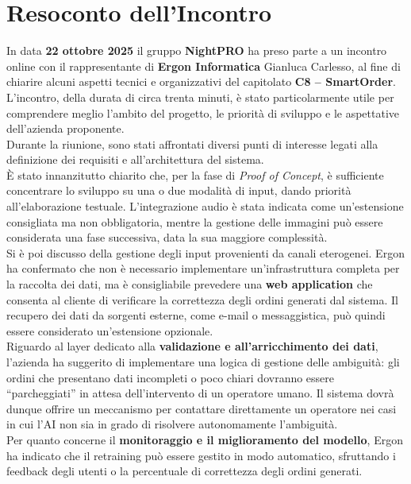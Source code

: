 \documentclass[a4paper, 11pt, oneside]{scrartcl} %
\begin{document}
\section{Resoconto dell'Incontro}

In data \textbf{22 ottobre 2025} il gruppo \textbf{NightPRO} ha preso parte a un incontro online con il rappresentante di \textbf{Ergon Informatica} Gianluca Carlesso, al fine di chiarire alcuni aspetti tecnici e organizzativi del capitolato \textbf{C8 – SmartOrder}.  
L’incontro, della durata di circa trenta minuti, è stato particolarmente utile per comprendere meglio l’ambito del progetto, le priorità di sviluppo e le aspettative dell’azienda proponente.
\noindent \\
Durante la riunione, sono stati affrontati diversi punti di interesse legati alla definizione dei requisiti e all’architettura del sistema.
\noindent \\
È stato innanzitutto chiarito che, per la fase di \textit{Proof of Concept}, è sufficiente concentrare lo sviluppo su una o due modalità di input, dando priorità all’elaborazione testuale.  
L’integrazione audio è stata indicata come un’estensione consigliata ma non obbligatoria, mentre la gestione delle immagini può essere considerata una fase successiva, data la sua maggiore complessità.
\noindent \\
Si è poi discusso della gestione degli input provenienti da canali eterogenei.  
Ergon ha confermato che non è necessario implementare un’infrastruttura completa per la raccolta dei dati, ma è consigliabile prevedere una \textbf{web application} che consenta al cliente di verificare la correttezza degli ordini generati dal sistema.  
Il recupero dei dati da sorgenti esterne, come e-mail o messaggistica, può quindi essere considerato un’estensione opzionale.
\noindent \\
Riguardo al layer dedicato alla \textbf{validazione e all’arricchimento dei dati}, l’azienda ha suggerito di implementare una logica di gestione delle ambiguità: gli ordini che presentano dati incompleti o poco chiari dovranno essere “parcheggiati” in attesa dell’intervento di un operatore umano.  
Il sistema dovrà dunque offrire un meccanismo per contattare direttamente un operatore nei casi in cui l’AI non sia in grado di risolvere autonomamente l’ambiguità.
\noindent \\
Per quanto concerne il \textbf{monitoraggio e il miglioramento del modello}, Ergon ha indicato che il retraining può essere gestito in modo automatico, sfruttando i feedback degli utenti o la percentuale di correttezza degli ordini generati.  
\end{document}
